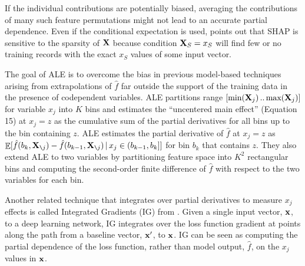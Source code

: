 \documentclass[smallextended]{svjour3}       %
\renewcommand{\slash}{\texttt{\char`\\}}
\DeclareMathOperator{\Ex}{\mathbb{E}}
\begin{document}
If the individual contributions are potentially biased, averaging the contributions of many such feature permutations might not lead to an accurate partial dependence.  Even if the conditional expectation is used, \citet{manyshap} points out that SHAP is sensitive to the sparsity of $\bf X$ because condition ${\bf X}_S = x_S$ will find few or no training records with the exact $x_S$ values of some input vector.


The goal of ALE \citep{ALE} is to overcome the bias in previous model-based techniques arising from extrapolations of $\hat{f}$ far outside the support of the training data in the presence of codependent variables.   ALE  partitions range $[\text{min}({\bf X}_j) \,..\, \text{max}({\bf X}_j)]$ for variable $x_j$ into $K$ bins and estimates the ``uncentered main effect'' (Equation 15) at $x_j = z$ as the cumulative sum of the partial derivatives for all bins up to the bin containing $z$. ALE estimates the partial derivative of $\hat{f}$ at $x_j=z$ as $\Ex[\hat{f}(b_k, {\bf X}_{\slash j}) - \hat{f}(b_{k-1}, {\bf X}_{\slash j}) \, | \, x_j \in (b_{k-1},b_k]]$ for bin $b_k$ that contains $z$. They also extend ALE to two variables by partitioning feature space into $K^2$ rectangular bins and computing the  second-order finite difference of $\hat{f}$ with respect to the two variables for each bin. 

Another related technique that integrates over partial derivatives to measure $x_j$ effects is called Integrated Gradients (IG) from \citet{intgrad}. Given a single input vector, $\bf x$, to a deep learning network, IG integrates over the loss function gradient at points along the path from a baseline vector, $\bf x'$, to $\bf x$. IG can be seen as computing the partial dependence of the loss function, rather than model output, $\hat{f}$, on the $x_j$ values in ${\bf x}$.
\end{document}

